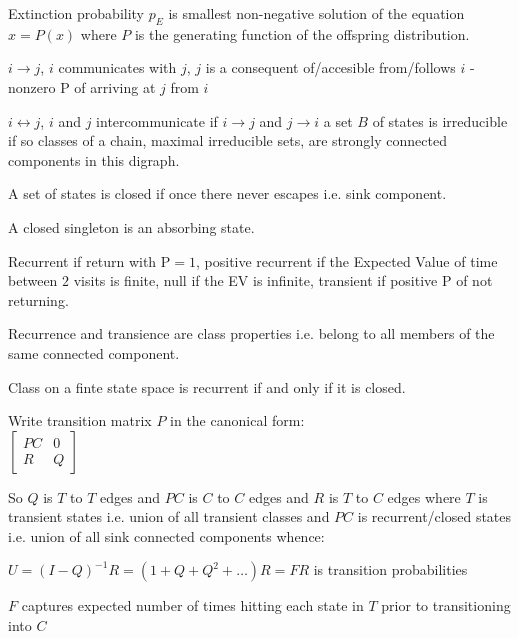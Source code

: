 Extinction probability $p_E$ is smallest non-negative solution of the equation $x=P(x)$ where $P$ is the generating function of the offspring distribution.

$i \rightarrow j$, $i$ communicates with $j$, $j$ is a consequent of/accesible from/follows $i$ - nonzero $\text{P}$ of arriving at $j$ from $i$

$i \leftrightarrow j$, $i$ and $j$ intercommunicate if $i \rightarrow j$ and $j \rightarrow i$ a set $B$ of states is irreducible if so classes of a chain, maximal irreducible sets, are strongly connected components in this digraph.

A set of states is closed if once there never escapes i.e. sink component.

A closed singleton is an absorbing state.

Recurrent if return with $\text{P}=1$, positive recurrent if the Expected Value of time between $2$ visits is finite, null if the EV is infinite, transient if positive $\text{P}$ of not returning.

Recurrence and transience are class properties i.e. belong to all members of the same connected component.

Class on a finte state space is recurrent if and only if it is closed.

Write transition matrix $P$ in the canonical form: \\
$\begin{bmatrix}
PC & 0 \\
R & Q
\end{bmatrix}$

So $Q$ is $T$ to $T$ edges and $PC$ is $C$ to $C$ edges and $R$ is $T$ to $C$ edges where $T$ is transient states i.e. union of all transient classes and $PC$ is recurrent/closed states i.e. union of all sink connected components whence:

$U=(I-Q)^{-1}R=(1+Q+Q^2+\dots)R=FR$ is transition probabilities

$F$ captures expected number of times hitting each state in $T$ prior to transitioning into $C$